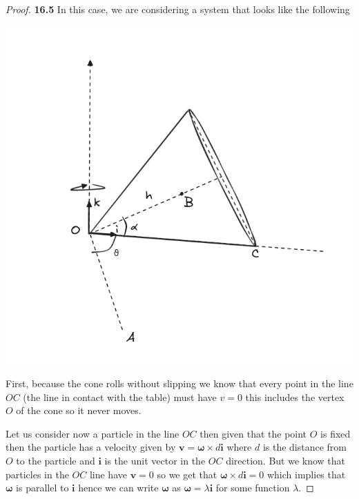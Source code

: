 \documentclass[11pt]{article}
\theoremstyle{definition}
\begin{document}
\begin{proof}{\textbf{16.5}}
    In this case, we are considering a system that looks like the following
    \begin{center}
        \includegraphics[scale=0.4]{ch16-5.png}
    \end{center}
    First, because the cone rolls without slipping we know that every point in
    the line $OC$ (the line in contact with the table) must have $v = 0$ this
    includes the vertex $O$ of the cone so it never moves.

    Let us consider now a particle in the line $OC$ then given that the point
    $O$ is fixed then the particle has a velocity given by
    $\bm{v} = \bm{\omega} \times d\bm{i}$ where $d$ is the distance from $O$ 
    to the particle and $\bm{i}$ is the unit vector in the $OC$ direction.
    But we know that particles in the $OC$ line have $\bm{v} = 0$
    so we get that $\bm{\omega} \times d\bm{i} = 0$ which implies that
    $\bm\omega$ is parallel to $\bm i$ hence we can write $\bm\omega$ as
    $\bm\omega = \lambda \bm{i}$ for some function $\lambda$.


\end{proof}
\end{document}
